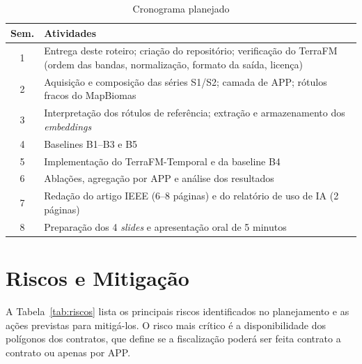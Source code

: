 \documentclass[conference]{IEEEtran}
\begin{document}
\begin{table}[htbp]
\caption{Cronograma planejado}
\begin{center}
\footnotesize
\begin{tabular}{|c|p{6.3cm}|}
\hline
\textbf{Sem.} & \textbf{Atividades} \\
\hline
1 & Entrega deste roteiro; criação do repositório; verificação do TerraFM (ordem das bandas, normalização, formato da saída, licença) \\
2 & Aquisição e composição das séries S1/S2; camada de APP; rótulos fracos do MapBiomas \\
3 & Interpretação dos rótulos de referência; extração e armazenamento dos \textit{embeddings} \\
4 & Baselines B1--B3 e B5 \\
5 & Implementação do TerraFM-Temporal e da baseline B4 \\
6 & Ablações, agregação por APP e análise dos resultados \\
7 & Redação do artigo IEEE (6--8 páginas) e do relatório de uso de IA (2 páginas) \\
8 & Preparação dos 4 \textit{slides} e apresentação oral de 5 minutos \\
\hline
\end{tabular}
\label{tab:cronograma}
\end{center}
\end{table}

\section{Riscos e Mitigação}\label{sec:riscos}

A Tabela~\ref{tab:riscos} lista os principais riscos identificados no planejamento e as ações previstas para mitigá-los. O risco mais crítico é a disponibilidade dos polígonos dos contratos, que define se a fiscalização poderá ser feita contrato a contrato ou apenas por APP.
\end{document}
